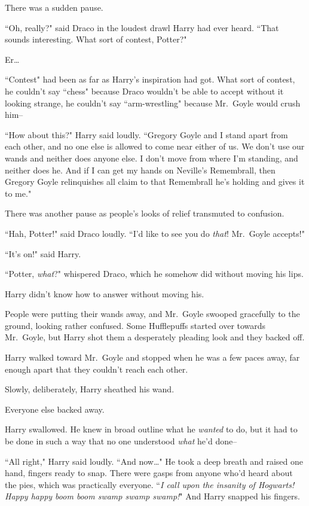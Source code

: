 There was a sudden pause.

``Oh, really?" said Draco in the loudest drawl Harry had ever heard. ``That sounds interesting. What sort of contest, Potter?"

Er{\ldots}

``Contest" had been as far as Harry's inspiration had got. What sort of contest, he couldn't say ``chess" because Draco wouldn't be able to accept without it looking strange, he couldn't say ``arm-wrestling" because Mr.~Goyle would crush him\---

``How about this?" Harry said loudly. ``Gregory Goyle and I stand apart from each other, and no one else is allowed to come near either of us. We don't use our wands and neither does anyone else. I don't move from where I'm standing, and neither does he. And if I can get my hands on Neville's Remembrall, then Gregory Goyle relinquishes all claim to that Remembrall he's holding and gives it to me."

There was another pause as people's looks of relief transmuted to confusion.

``Hah, Potter!" said Draco loudly. ``I'd like to see you do \emph{that}! Mr.~Goyle accepts!"

``It's on!" said Harry.

``Potter, \emph{what}?" whispered Draco, which he somehow did without moving his lips.

Harry didn't know how to answer without moving his.

People were putting their wands away, and Mr.~Goyle swooped gracefully to the ground, looking rather confused. Some Hufflepuffs started over towards Mr.~Goyle, but Harry shot them a desperately pleading look and they backed off.

Harry walked toward Mr.~Goyle and stopped when he was a few paces away, far enough apart that they couldn't reach each other.

Slowly, deliberately, Harry sheathed his wand.

Everyone else backed away.

Harry swallowed. He knew in broad outline what he \emph{wanted} to do, but it had to be done in such a way that no one understood \emph{what} he'd done\---

``All right," Harry said loudly. ``And now{\ldots}" He took a deep breath and raised one hand, fingers ready to snap. There were gasps from anyone who'd heard about the pies, which was practically everyone. ``\emph{I call upon the insanity of Hogwarts! Happy happy boom boom swamp swamp swamp!}" And Harry snapped his fingers.

